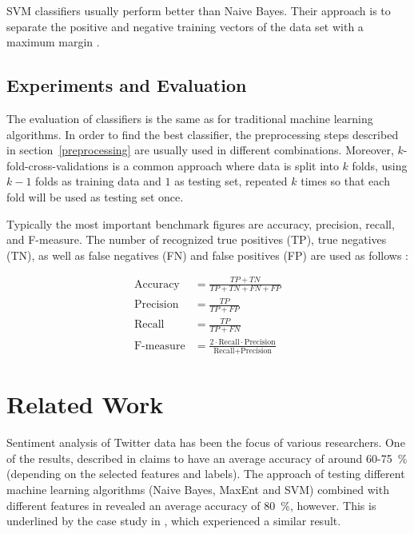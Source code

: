 \documentclass{acm_proc_article-sp}
\begin{document}
SVM classifiers usually perform better than Naive Bayes.
Their approach is to separate the
positive and negative training vectors of the data set with a maximum margin
\cite{ye2009sentiment}.

\subsection{Experiments and Evaluation}

The evaluation of classifiers is the
same as for traditional machine learning algorithms. In order to find the best
classifier, the preprocessing steps described in section~\ref{preprocessing}
are usually used in different combinations. Moreover, $k$-fold-cross-validations
is a common approach where data is split into $k$ folds, using $k-1$ folds as
training data and $1$ as testing set, repeated $k$ times so that each fold will be
used as testing set once. 

Typically the most important benchmark figures are accuracy, precision, recall,
and F-measure. The number of recognized true positives (TP), true negatives
(TN), as well as false negatives (FN) and  false positives (FP) are used as follows \cite{haddi2013therole, ting2011naive,
sokolova2006beyond, pak2010twitter, ye2009sentiment}:

\begin{align*}
\text{Accuracy} &= \frac{TP+TN}{TP+TN+FN+FP} \\
\text{Precision} &= \frac{TP}{TP+FP} \\
\text{Recall} &= \frac{TP}{TP+FN} \\
\text{F-measure} &= \frac{2 \cdot \text{Recall} \cdot \text{Precision}}{\text{Recall}+\text{Precision}}
\end{align*}


\section{Related Work} \label{related}

Sentiment analysis of Twitter data
has been the focus of various researchers. One of the results, described in
\cite{agarwal2011sentiment} claims to have an average accuracy of around
60-75~\% (depending on the selected features and labels).  The approach of
testing different machine learning algorithms (Naive Bayes, MaxEnt and SVM)
combined with different features in \cite{go2009twitter} revealed an average
accuracy of 80~\%, however. This is underlined by the case study in
\cite{lin2012large}, which experienced a similar result.
\end{document}
